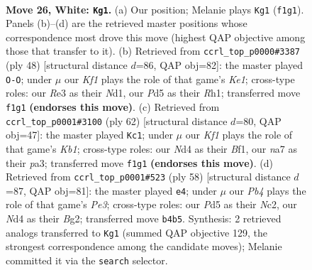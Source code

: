 \documentclass[11pt]{article}
\begin{document}
\clearpage

\begin{figure}[p]\centering
\begin{subfigure}{0.46\textwidth}\centering
\resizebox{\linewidth}{!}{%
\newchessgame
\chessboard[
  setfen={1rq2bk1/n1p1r3/p2p1pp1/3P3p/RP1NP3/4R2P/3B1PP1/1Q3K2 w - - 1 26},
  showmover=false,
  pgfstyle=straightmove, color=movearrow, markmove={f1-g1}
]}
\caption{}
\end{subfigure}\hfill
\begin{subfigure}{0.46\textwidth}\centering
\resizebox{\linewidth}{!}{%
\newchessgame
\chessboard[
  setfen={rq2r1k1/3p1pb1/p5pp/2pP4/1nB2P1P/R3P1P1/1P6/1Q1NK2R w K - 2 25},
  showmover=false,
  pgfstyle=straightmove, color=movearrow, markmove={e1-g1}
]}
\caption{}
\end{subfigure}
\\[4pt]
\begin{subfigure}{0.46\textwidth}\centering
\resizebox{\linewidth}{!}{%
\newchessgame
\chessboard[
  setfen={4kb2/2r2p2/2q3r1/4pNP1/1p1pP2P/pP1R4/P1P3Q1/1K3B2 w - - 3 32},
  showmover=false,
  pgfstyle=straightmove, color=movearrow, markmove={b1-c1}
]}
\caption{}
\end{subfigure}\hfill
\begin{subfigure}{0.46\textwidth}\centering
\resizebox{\linewidth}{!}{%
\newchessgame
\chessboard[
  setfen={1rb1r1k1/1q3pnp/p2p2p1/2pP4/8/R3P1PP/1PN2PB1/1RQ3K1 w - - 1 30},
  showmover=false,
  pgfstyle=straightmove, color=movearrow, markmove={e3-e4}
]}
\caption{}
\end{subfigure}
\caption{\textbf{Move 26, White: \texttt{Kg1}.} (a) Our position; Melanie plays \texttt{Kg1} (\texttt{f1g1}). Panels (b)--(d) are the retrieved master positions whose correspondence most drove this move (highest QAP objective among those that transfer to it). (b) Retrieved from \texttt{ccrl\_top\_p0000\#3387} (ply 48) [structural distance $d$=86, QAP obj=82]: the master played \texttt{O-O}; under $\mu$ our \emph{Kf1} plays the role of that game's \emph{Ke1}; cross-type roles: our \emph{R}e3 as their \emph{N}d1, our \emph{P}d5 as their \emph{R}h1; transferred move \texttt{f1g1} \textbf{(endorses this move)}. (c) Retrieved from \texttt{ccrl\_top\_p0001\#3100} (ply 62) [structural distance $d$=80, QAP obj=47]: the master played \texttt{Kc1}; under $\mu$ our \emph{Kf1} plays the role of that game's \emph{Kb1}; cross-type roles: our \emph{N}d4 as their \emph{B}f1, our \emph{n}a7 as their \emph{p}a3; transferred move \texttt{f1g1} \textbf{(endorses this move)}. (d) Retrieved from \texttt{ccrl\_top\_p0001\#523} (ply 58) [structural distance $d$=87, QAP obj=81]: the master played \texttt{e4}; under $\mu$ our \emph{Pb4} plays the role of that game's \emph{Pe3}; cross-type roles: our \emph{P}d5 as their \emph{N}c2, our \emph{N}d4 as their \emph{B}g2; transferred move \texttt{b4b5}. Synthesis: 2 retrieved analogs transferred to \texttt{Kg1} (summed QAP objective 129, the strongest correspondence among the candidate moves); Melanie committed it via the \texttt{search} selector.}
\label{fig:thought-m50}
\end{figure}
\end{document}
